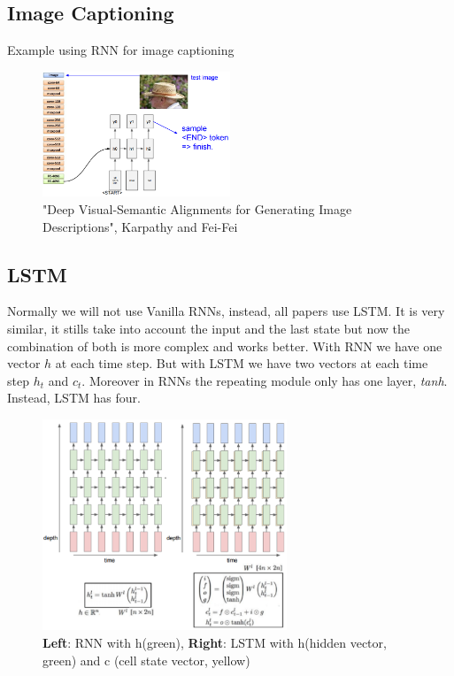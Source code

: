 \documentclass{article}
\begin{document}
	\subsection{Image Captioning}
	Example using RNN for image captioning
	\begin{figure}[h]
		\centering
		\includegraphics[width=0.5\textwidth]{Images/recurrent_neural_networks/6.png}
		\caption{"Deep Visual-Semantic Alignments for Generating Image Descriptions", Karpathy and Fei-Fei}
	\end{figure}
	
	\subsection{LSTM}
	Normally we will not use Vanilla RNNs, instead, all papers use LSTM. It is very similar, it stills take into account the input and the last state but now the combination of both is more complex and works better. With RNN we have one vector $h$ at each time step. But with LSTM we have two vectors at each time step $h_t$ and $c_t$. Moreover in RNNs the repeating module only has one layer, \textit{tanh}. Instead, LSTM has four.
	
	\begin{figure}[ht]
		\centering
		\includegraphics[width=0.65\textwidth]{Images/recurrent_neural_networks/18.png}
		\caption{\textbf{Left}: RNN with h(green), \textbf{Right}: LSTM with h(hidden vector, green) and c (cell state vector, yellow) }
	\end{figure}
	
\end{document}
